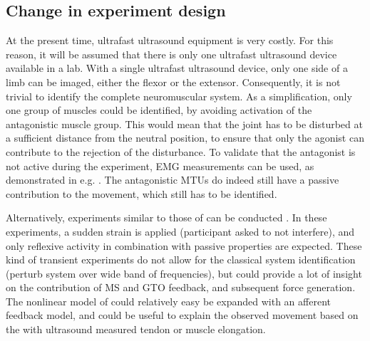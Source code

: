 \subsection{Change in experiment design}
At the present time, ultrafast ultrasound equipment is very costly. For this reason, it will be assumed that there is only one ultrafast ultrasound device available in a lab. With a single ultrafast ultrasound device, only one side of a limb can be imaged, either the flexor or the extensor. Consequently, it is not trivial to identify the complete neuromuscular system. As a simplification, only one group of muscles could be identified, by avoiding activation of the antagonistic muscle group. This would mean that the joint has to be disturbed at a sufficient distance from the neutral position, to ensure that only the agonist can contribute to the rejection of the disturbance. To validate that the antagonist is not active during the experiment, EMG measurements can be used, as demonstrated in e.g. \cite{kearney_identification_1997, mirbagheri_intrinsic_2000}. The antagonistic MTUs do indeed still have a passive contribution to the movement, which still has to be identified. 

Alternatively, experiments similar to those of \citeauthor{de_gooijer-van_de_groep_estimation_2016} can be conducted \cite{de_gooijer-van_de_groep_estimation_2016}. In these experiments, a sudden strain is applied (participant asked to not interfere), and only reflexive activity in combination with passive properties are expected. These kind of transient experiments do not allow for the classical system identification (perturb system over wide band of frequencies), but could provide a lot of insight on the contribution of MS and GTO feedback, and subsequent force generation. The nonlinear model of \cite{de_gooijer-van_de_groep_estimation_2016} could relatively easy be expanded with an afferent feedback model, and could be useful to explain the observed movement based on the with ultrasound measured tendon or muscle elongation. 


